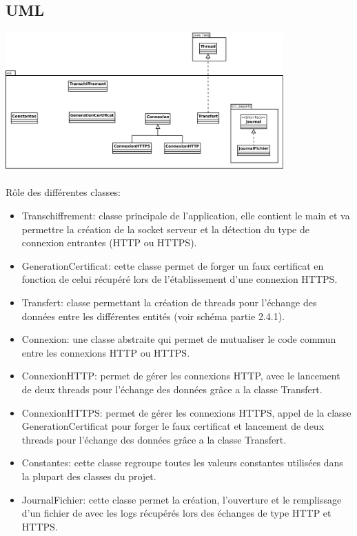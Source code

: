 \documentclass[a4paper,11pt,french]{report}
\begin{document}
\subsection{UML}
\includegraphics[width=0.8\textwidth]{images/uml.pdf}
~~\\
~~\\
Rôle des différentes classes:
\begin{itemize}
	\item Transchiffrement: classe principale de l'application, elle contient le main et va permettre la création de la socket serveur et la détection du type de connexion entrantes (HTTP ou HTTPS).
	\item GenerationCertificat: cette classe permet de forger un faux certificat en fonction de celui récupéré lors de l'établissement d'une connexion HTTPS.
	\item Transfert: classe permettant la création de threads pour l'échange des données entre les différentes entités (voir schéma partie 2.4.1).
	\item Connexion: une classe abstraite qui permet de mutualiser le code commun entre les connexions HTTP ou HTTPS.
	\item ConnexionHTTP: permet de gérer les connexions HTTP, avec le lancement de deux threads pour l'échange des données grâce a la classe Transfert.
	\item ConnexionHTTPS: permet de gérer les connexions HTTPS, appel de la classe GenerationCertificat pour forger le faux certificat et lancement de deux threads pour l'échange des données grâce a la classe Transfert.
	\item Constantes: cette classe regroupe toutes les valeurs constantes utilisées dans la plupart des classes du projet.
	\item JournalFichier: cette classe permet la création, l'ouverture et le remplissage d'un fichier de avec les logs récupérés lors des échanges de type HTTP et HTTPS.
\end{itemize}
\end{document}
